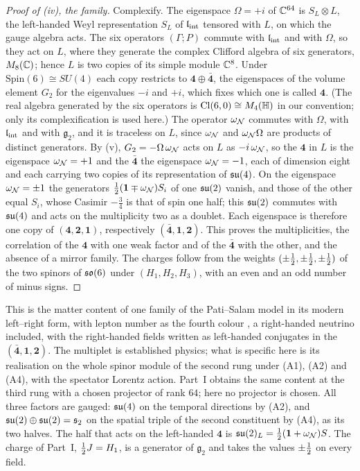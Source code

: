 \begin{proof}[Proof of (iv), the family]
Complexify. The eigenspace $\Omega=+i$ of $\mathbb{C}^{64}$ is $S_L\otimes L$, the left-handed Weyl representation $S_L$ of $\mathfrak l_{\rm int}$ tensored with
$L$, on which the gauge algebra acts. The six operators $(\Gamma;P)$ commute with $\mathfrak l_{\rm int}$ and with $\Omega$, so they act on $L$, where they
generate the complex Clifford algebra of six generators, $M_8(\mathbb{C})$; hence $L$ is two copies of its simple module $\mathbb{C}^8$. Under
$\mathrm{Spin}(6)\cong SU(4)$ each copy restricts to $\mathbf4\oplus\bar{\mathbf4}$, the eigenspaces of the volume element $G_2$ for the
eigenvalues $-i$ and $+i$, which fixes which one is called $\mathbf4$. (The real algebra generated by the six operators is
$\mathrm{Cl}(6,0)\cong M_4(\mathbb H)$ in our convention; only its complexification is used here.) The operator $\omega_\mathcal N$ commutes with $\Omega$,
with $\mathfrak l_{\rm int}$ and with $\mathfrak g_2$, and it is traceless on $L$, since $\omega_\mathcal N$ and $\omega_\mathcal N\Omega$ are products of distinct
generators. By (v), $G_2=-\Omega\,\omega_\mathcal N$ acts on $L$ as $-i\,\omega_\mathcal N$, so the $\mathbf4$ in $L$ is the eigenspace $\omega_\mathcal N=+1$ and the
$\bar{\mathbf4}$ the eigenspace $\omega_\mathcal N=-1$, each of dimension eight and each carrying two copies of its representation of $\mathfrak{su}(4)$. On the
eigenspace $\omega_\mathcal N=\pm1$ the generators $\tfrac12(\mathbf 1\mp\omega_\mathcal N)S_i$ of one $\mathfrak{su}(2)$ vanish, and those of the other equal $S_i$, whose
Casimir $-\tfrac34$ is that of spin one half; this $\mathfrak{su}(2)$ commutes with $\mathfrak{su}(4)$ and acts on the multiplicity two as a doublet. Each eigenspace
is therefore one copy of $(\mathbf4,\mathbf2,\mathbf1)$, respectively $(\bar{\mathbf4},\mathbf1,\mathbf2)$. This proves the multiplicities,
the correlation of the $\mathbf4$ with one weak factor and of the $\bar{\mathbf4}$ with the other, and the absence of a mirror family. The
charges follow from the weights $(\pm\tfrac12,\pm\tfrac12,\pm\tfrac12)$ of the two spinors of $\mathfrak{so}(6)$ under $(H_1,H_2,H_3)$, with an even and an odd
number of minus signs.
\end{proof}

This is the matter content of one family of the Pati--Salam model in its modern left--right form, with lepton number as the fourth
colour \cite{PatiSalam}, a right-handed neutrino included, with the right-handed fields
written as left-handed conjugates in the $(\bar{\mathbf4},\mathbf1,\mathbf2)$. The multiplet is established physics; what is specific here is
its realisation on the whole spinor module of the second rung under (A1), (A2) and (A4), with the spectator Lorentz action. Part~I obtains
the same content at the third rung with a chosen projector of rank $64$; here no projector is chosen. All three factors are gauged:
$\mathfrak{su}(4)$ on the temporal directions by (A2), and $\mathfrak{su}(2)\oplus\mathfrak{su}(2)=\mathfrak s_2$ on the spatial triple of the second constituent by (A4), as its
two halves. The half that acts on the left-handed $\mathbf4$ is $\mathfrak{su}(2)_L=\tfrac12(\mathbf 1+\omega_\mathcal N)S$. The charge of Part~I, $\tfrac12 J=H_1$, is a
generator of $\mathfrak g_2$ and takes the values $\pm\tfrac12$ on every field.

